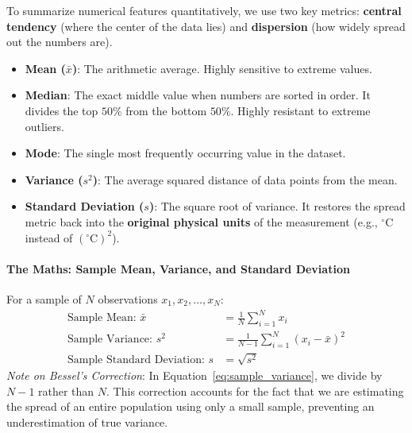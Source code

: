 To summarize numerical features quantitatively, we use two key metrics: \textbf{central tendency} (where the center of the data lies) and \textbf{dispersion} (how widely spread out the numbers are).
\begin{itemize}
    \item \textbf{Mean ($\bar{x}$)}: The arithmetic average. Highly sensitive to extreme values.
    \item \textbf{Median}: The exact middle value when numbers are sorted in order. It divides the top $50\%$ from the bottom $50\%$. Highly resistant to extreme outliers.
    \item \textbf{Mode}: The single most frequently occurring value in the dataset.
    \item \textbf{Variance ($s^2$)}: The average squared distance of data points from the mean.
    \item \textbf{Standard Deviation ($s$)}: The square root of variance. It restores the spread metric back into the \textbf{original physical units} of the measurement (e.g., $^\circ\text{C}$ instead of $(^\circ\text{C})^2$).
\end{itemize}

\paragraph{The Maths: Sample Mean, Variance, and Standard Deviation}
For a sample of $N$ observations $x_1, x_2, \dots, x_N$:
\begin{align}
\text{Sample Mean: } \bar{x} &= \frac{1}{N} \sum_{i=1}^N x_i\label{eq:sample_mean_stat} \\
\text{Sample Variance: } s^2 &= \frac{1}{N - 1} \sum_{i=1}^N (x_i - \bar{x})^2\label{eq:sample_variance} \\
\text{Sample Standard Deviation: } s &= \sqrt{s^2}\label{eq:sample_std}
\end{align}
\textit{Note on Bessel's Correction}: In Equation~\ref{eq:sample_variance}, we divide by $N - 1$ rather than $N$. This correction accounts for the fact that we are estimating the spread of an entire population using only a small sample, preventing an underestimation of true variance.


